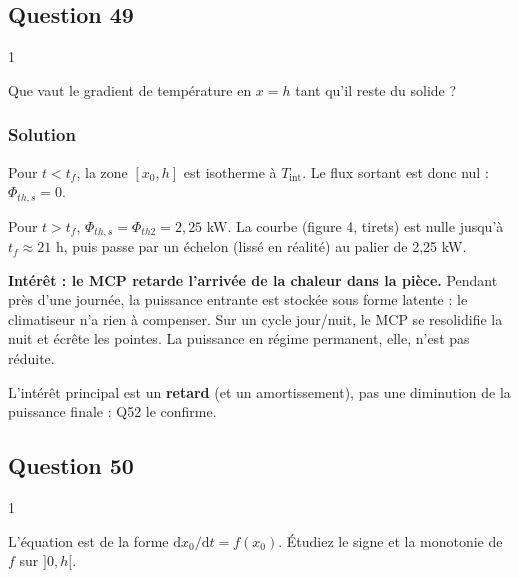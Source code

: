 \documentclass[11pt,a4paper]{article}
\begin{document}
\hypertarget{question-49}{%
\subsection{Question 49}\label{question-49}}

\begin{indication}{1}

Que vaut le gradient de température en \(x = h\) tant qu'il reste du solide ?

\end{indication}

\hypertarget{solution-48}{%
\subsubsection{Solution}\label{solution-48}}

Pour \(t<t_f\), la zone \([x_0, h]\) est isotherme à \(T_{\text{int}}\). Le flux sortant est donc nul : \(\Phi_{th,s} = 0\).

Pour \(t>t_f\), \(\Phi_{th,s} = \Phi_{th2} = 2{,}25\) kW. La courbe (figure 4, tirets) est nulle jusqu'à \(t_f\approx21\) h, puis passe par un échelon (lissé en réalité) au palier de 2,25 kW.

\textbf{Intérêt : le MCP retarde l'arrivée de la chaleur dans la pièce.} Pendant près d'une journée, la puissance entrante est stockée sous forme latente : le climatiseur n'a rien à compenser. Sur un cycle jour/nuit, le MCP se resolidifie la nuit et écrête les pointes. La puissance en régime permanent, elle, n'est pas réduite.

\begin{piege}

L'intérêt principal est un \textbf{retard} (et un amortissement), pas une diminution de la puissance finale : Q52 le confirme.

\end{piege}

\hypertarget{question-50}{%
\subsection{Question 50}\label{question-50}}

\begin{indication}{1}

L'équation est de la forme \(\mathrm{d}x_0/\mathrm{d}t = f(x_0)\). Étudiez le signe et la monotonie de \(f\) sur \(]0,h[\).

\end{indication}
\end{document}
